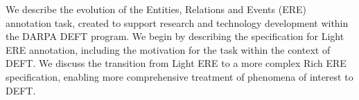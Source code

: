 We describe the evolution of the Entities, Relations and Events (ERE) annotation task, created to support research and technology development within the DARPA DEFT program. We begin by describing the specification for Light ERE annotation, including the motivation for the task within the context of DEFT. We discuss the transition from Light ERE to a more complex Rich ERE specification, enabling more comprehensive treatment of phenomena of interest to DEFT.
